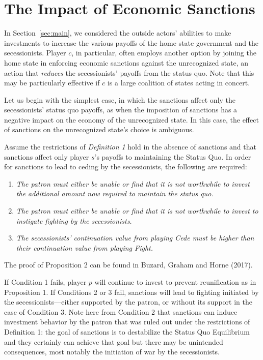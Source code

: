 \section{The Impact of Economic Sanctions}
\label{sec:sanctions}

In Section~\ref{sec:main}, we considered the outside actors' abilities to make investments to increase the various payoffs of the home state government and the secessionists. Player $c$, in particular, often employs another option by joining the home state in enforcing economic sanctions against the unrecognized state, an action that \emph{reduces} the secessionists' payoffs from the status quo. Note that this may be particularly effective if $c$ is a large coalition of states acting in concert. 

Let us begin with the simplest case, in which the sanctions affect only the secessionists' status quo payoffs, as when the imposition of sanctions has a negative impact on the economy of the unrecognized state. In this case, the effect of sanctions on the unrecognized state's choice is ambiguous. 

\begin{proposition}
Assume the restrictions of \emph{Definition 1} hold in the absence of sanctions and that sanctions affect only player $s$'s payoffs to maintaining the Status Quo.  In order for sanctions to lead to ceding by the secessionists, the following are required:

\begin{enumerate}
\item \textit{The patron must either be unable or find that it is not worthwhile to invest the additional amount now required to maintain the status quo.}

\item \textit{The patron must either be unable or find that it is not worthwhile to invest to instigate fighting by the secessionists.}

\item \textit{The secessionists' continuation value from playing Cede must be higher than their continuation value from playing Fight.}
\end{enumerate}

\end{proposition}

The proof of Proposition 2 can be found in Buzard, Graham and Horne (2017).

If Condition 1 fails, player $p$ will continue to invest to prevent reunification as in Proposition 1. If Conditions 2 or 3 fail, sanctions will lead to fighting initiated by the secessionists---either supported by the patron, or without its support in the case of Condition 3. Note here from Condition 2 that sanctions can induce investment behavior by the patron that was ruled out under the restrictions of Definition 1: the goal of sanctions is to destabilize the Status Quo Equilibrium and they certainly can achieve that goal but there may be unintended consequences, most notably the initiation of war by the secessionists. 

